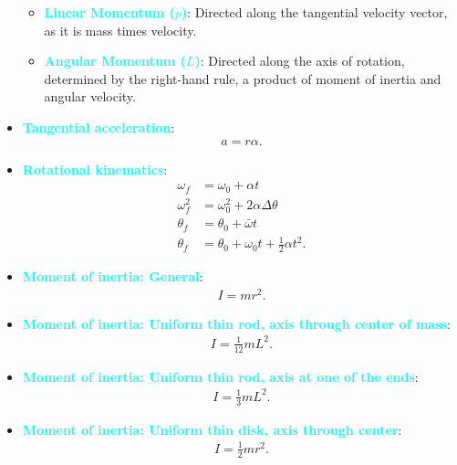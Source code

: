 \documentclass{report}
\begin{document}
\begin{itemize}
\begin{itemize}
                \item \textbf{\textcolor{cyan}{Linear Momentum (\(p\))}}: Directed along the tangential velocity vector, as it is mass times velocity.
                \item \textbf{\textcolor{cyan}{Angular Momentum (\(L\))}}: Directed along the axis of rotation, determined by the right-hand rule, a product of moment of inertia and angular velocity.
            \end{itemize}
        \item \textbf{\textcolor{cyan}{Tangential acceleration}}:
            \begin{align*}
                a = r\alpha
            .\end{align*}
        \item \textbf{\textcolor{cyan}{Rotational kinematics}}:
            \begin{align*}
                \omega_{f} &= \omega_{0} + \alpha t \\
                \omega_{f}^{2} &= \omega_{0}^{2} + 2\alpha\Delta \theta  \\
                \theta_{f} &= \theta_{0} + \bar{\omega} t \\
                \theta_{f} &= \theta_{0} + \omega_{0}t + \frac{1}{2}\alpha t^{2}
            .\end{align*}
        \item \textbf{\textcolor{cyan}{Moment of inertia: General}}:
            \begin{align*}
                I = mr^{2}
            .\end{align*}
        \item \textbf{\textcolor{cyan}{Moment of inertia: Uniform thin rod, axis through center of mass}}:
            \begin{align*}
                I = \frac{1}{12}mL^{2}
            .\end{align*}
        \item \textbf{\textcolor{cyan}{Moment of inertia: Uniform thin rod, axis at one of the ends}}:
            \begin{align*}
                I = \frac{1}{3}mL^{2}
            .\end{align*}
        \item \textbf{\textcolor{cyan}{Moment of inertia: Uniform thin disk, axis through center}}:
            \begin{align*}
                I = \frac{1}{2}mr^{2}
            .\end{align*}

\end{itemize}
\end{document}
